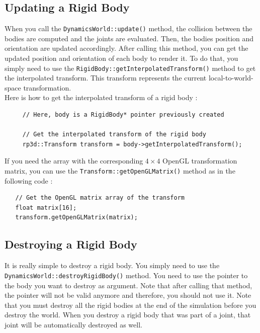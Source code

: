 \documentclass[a4paper,12pt]{article}
\begin{document}
    \subsection{Updating a Rigid Body}

    When you call the \texttt{DynamicsWorld::update()} method, the collision between the bodies are computed and the joints are evaluated. Then, the bodies position and orientation
    are updated accordingly. After calling this method, you can get the updated position and orientation of each body to render it. To do that, you simply need to use the
    \texttt{RigidBody::getInterpolatedTransform()} method to get the interpolated transform. This transform represents the current local-to-world-space transformation. \\

    Here is how to get the interpolated transform of a rigid body : \\

    \begin{lstlisting}
     // Here, body is a RigidBody* pointer previously created

     // Get the interpolated transform of the rigid body
     rp3d::Transform transform = body->getInterpolatedTransform();
  \end{lstlisting}

    \vspace{0.6cm}

    If you need the array with the corresponding $4 \times 4$ OpenGL transformation matrix, you can use the \texttt{Transform::getOpenGLMatrix()} method as in the following code : \\

    \begin{lstlisting}
   // Get the OpenGL matrix array of the transform
   float matrix[16];
   transform.getOpenGLMatrix(matrix);
  \end{lstlisting}

    \subsection{Destroying a Rigid Body}

    \begin{sloppypar}
    It is really simple to destroy a rigid body. You simply need to use the \texttt{DynamicsWorld::destroyRigidBody()} method. You need to use the pointer to the body you
    want to destroy as argument. Note that after calling that method, the pointer will not be valid anymore and therefore, you should not use it. Note that you must
    destroy all the rigid bodies at the end of the simulation before you destroy the world. When you destroy a rigid body that was part of a joint, that joint will be automatically
    destroyed as well. \\
    \end{sloppypar}
\end{document}

